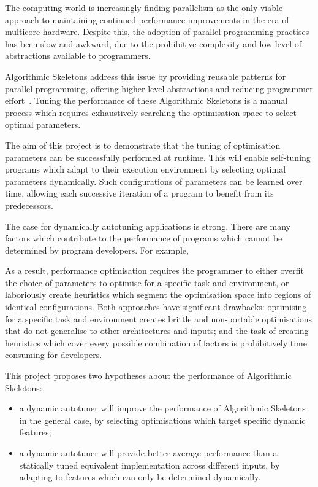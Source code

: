 The computing world is increasingly finding parallelism as the only
viable approach to maintaining continued performance improvements in
the era of multicore hardware. Despite this, the adoption of parallel
programming practises has been slow and awkward, due to the
prohibitive complexity and low level of abstractions available to
programmers.

Algorithmic Skeletons address this issue by providing reusable
patterns for parallel programming, offering higher level abstractions
and reducing programmer effort~\cite{Cole1989, Cole2004}. Tuning the
performance of these Algorithmic Skeletons is a manual process which
requires exhaustively searching the optimisation space to select
optimal parameters.

The aim of this project is to demonstrate that the tuning of
optimisation parameters can be successfully performed at runtime. This
will enable self-tuning programs which adapt to their execution
environment by selecting optimal parameters dynamically. Such
configurations of parameters can be learned over time, allowing each
successive iteration of a program to benefit from its predecessors.

The case for dynamically autotuning applications is strong. There are
many factors which contribute to the performance of programs which
cannot be determined by program developers. For example,

As a result, performance optimisation requires the programmer to
either overfit the choice of parameters to optimise for a specific
task and environment, or laboriously create heuristics which segment
the optimisation space into regions of identical configurations. Both
approaches have significant drawbacks: optimising for a specific task
and environment creates brittle and non-portable optimisations that do
not generalise to other architectures and inputs; and the task of
creating heuristics which cover every possible combination of factors
is prohibitively time consuming for developers.

This project proposes two hypotheses about the performance of
Algorithmic Skeletons:
\begin{itemize}
\item a dynamic autotuner will improve the performance of Algorithmic
  Skeletons in the general case, by selecting optimisations which
  target specific dynamic features;
\item a dynamic autotuner will provide better average performance than
  a statically tuned equivalent implementation across different
  inputs, by adapting to features which can only be determined
  dynamically.
\end{itemize}

